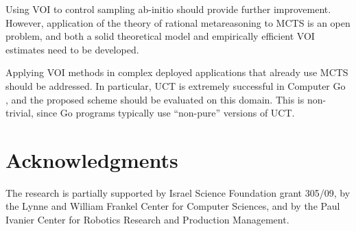 \documentclass[letterpaper]{article}
\begin{document}
Using VOI to control sampling ab-initio should provide further
improvement. However, application of the theory of rational
metareasoning to MCTS is an open problem, and both a solid theoretical
model and empirically efficient VOI estimates need to be developed.

Applying VOI methods in complex deployed applications that
already use MCTS should be addressed.  In particular, UCT is extremely
successful in Computer Go
\cite{GellyWang.mogo,Braudis.pachi,Enzenberger.Fuego}, and the
proposed scheme should be evaluated on this domain. This is
non-trivial, since Go programs typically use ``non-pure'' versions of
UCT.


\section*{Acknowledgments}

The research is partially supported by Israel
Science Foundation grant 305/09, by the Lynne and William Frankel
Center for Computer Sciences, and by the Paul Ivanier Center for
Robotics Research and Production Management.



\end{document}
